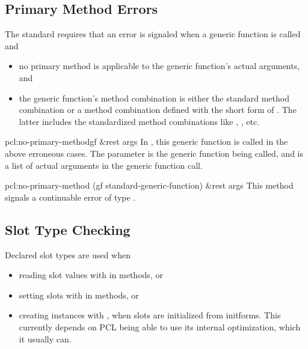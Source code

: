 \subsection{Primary Method Errors}

The standard requires that an error is signaled when a generic
function is called and

\begin{itemize}
\item no primary method is applicable to the generic function's actual
  arguments, and
\item the generic function's method combination is either the standard
  method combination or a method combination defined with the short
  form of .  The latter includes the
  standardized method combinations like , , etc.
\end{itemize}

\begin{defgeneric}[-generic]{pcl:}{no-primary-method}{gf \&rest args}
  In \cmucl, this generic function is called in the above erroneous
  cases.  The parameter  is the generic function being
  called, and  is a list of actual arguments in the generic
  function call.
\end{defgeneric}

\begin{defmethod}[-standard]{pcl:}{no-primary-method}{%
    (gf standard-generic-function) \&rest args}
  This method signals a continuable error of type
  .
\end{defmethod}


\subsection{Slot Type Checking}

Declared slot types are used when 

\begin{itemize}
\item reading slot values with  in methods, or

\item setting slots with  in methods, or 
  
\item creating instances with , when slots are
  initialized from initforms.  This currently depends on PCL being
  able to use its internal  optimization, which it
  usually can.
\end{itemize}

